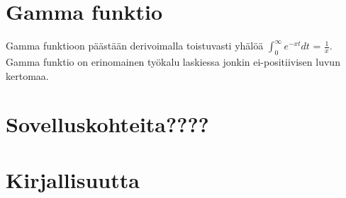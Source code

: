 \documentclass[12pt]{article}
\begin{document}
\section{Gamma funktio}\label{luk: gammafunktio}
\onehalfspacing
Gamma funktioon päästään derivoimalla toistuvasti yhälöä \newline
$\int_{0}^{\infty} e^{-xt} dt$ = $\frac{1}{x}$.
\newline
Gamma funktio on erinomainen työkalu laskiessa jonkin ei-positiivisen luvun kertomaa. 
\newpage
\section{Sovelluskohteita????}
\newpage
\section{Kirjallisuutta}
\end{document}

